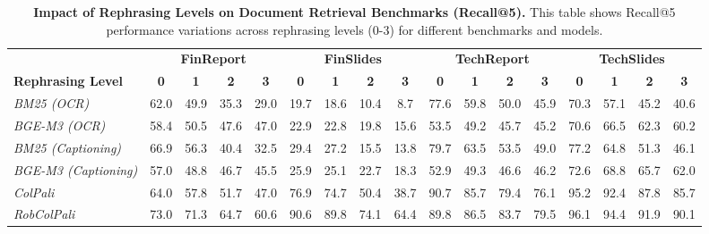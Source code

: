 \begin{table*}[t]
\footnotesize
\renewcommand{\arraystretch}{1.5} %
\setlength\tabcolsep{4pt} %
\caption{
\textbf{Impact of Rephrasing Levels on Document Retrieval Benchmarks (Recall@5).}
This table shows Recall@5 performance variations across rephrasing levels (0-3) for different benchmarks and models.}
\begin{tabular*}{1.03\linewidth}{@{\extracolsep{\fill}}l|cccc|cccc|cccc|cccc} 
\toprule
 & \multicolumn{4}{c|}{\textbf{FinReport}} & \multicolumn{4}{c|}{\textbf{FinSlides}} & \multicolumn{4}{c|}{\textbf{TechReport}} & \multicolumn{4}{c}{\textbf{TechSlides}} \\
\textbf{Rephrasing Level} & \textbf{0} & \textbf{1} & \textbf{2} & \textbf{3} & \textbf{0} & \textbf{1} & \textbf{2} & \textbf{3} & \textbf{0} & \textbf{1} & \textbf{2} & \textbf{3} & \textbf{0} & \textbf{1} & \textbf{2} & \textbf{3} \\

\textit{BM25 (OCR)} & 
62.0 & 49.9 & 35.3 & 29.0 &
19.7 & 18.6 & 10.4 & 8.7 &
77.6 & 59.8 & 50.0 & 45.9 &
70.3 & 57.1 & 45.2 & 40.6 \\

\textit{BGE-M3 (OCR)} & 
58.4 & 50.5 & 47.6 & 47.0 &
22.9 & 22.8 & 19.8 & 15.6 &
53.5 & 49.2 & 45.7 & 45.2 &
70.6 & 66.5 & 62.3 & 60.2  \\

\textit{BM25 (Captioning)} & 
66.9 & 56.3 & 40.4 & 32.5 &
29.4 & 27.2 & 15.5 & 13.8 &
79.7 & 63.5 & 53.5 & 49.0 &
77.2 & 64.8 & 51.3 & 46.1 \\

\textit{BGE-M3 (Captioning)} & 
57.0 & 48.8 & 46.7 & 45.5 &
25.9 & 25.1 & 22.7 & 18.3 &
52.9 & 49.3 & 46.6 & 46.2 &
72.6 & 68.8 & 65.7 & 62.0 \\
\addlinespace
\addlinespace
\textit{ColPali} & 
64.0 & 57.8 & 51.7 & 47.0 &  
76.9 & 74.7 & 50.4 & 38.7 & 
90.7 & 85.7 & 79.4 & 76.1 & 
95.2 & 92.4 & 87.8 & 85.7 \\

\hspace{0.3cm}\textit{RobColPali} & 
73.0 & 71.3 & 64.7 & 60.6 & 
90.6 & 89.8 & 74.1 & 64.4 & 
89.8 & 86.5 & 83.7 & 79.5 & 
96.1 & 94.4 & 91.9 & 90.1 \\


\end{tabular*}
\end{table*}
